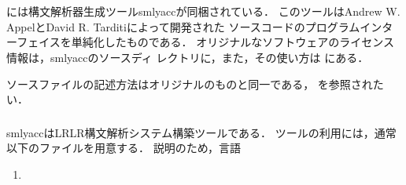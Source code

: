 \part{}

\ifjp%
\else%
\fi%


\chapter{}
\ifjp%
	\smlsharp{}には構文解析器生成ツールsmlyaccが同梱されている．
	このツールはAndrew W. AppelとDavid R. Tarditiによって開発された
ソースコードのプログラムインターフェイスを単純化したものである．
	オリジナルなソフトウェアのライセンス情報は，smlyaccのソースディ
レクトリに，また，その使い方は
にある．

	ソースファイルの記述方法はオリジナルのものと同一である，
を参照されたい．
\else%
\fi%

\section{}

\ifjp%
	smlyaccはLRLR構文解析システム構築ツールである．
	ツールの利用には，通常以下のファイルを用意する．
	説明のため，言語
\begin{enumerate}
\item 
\end{enumerate}
	

\else%
\fi%
